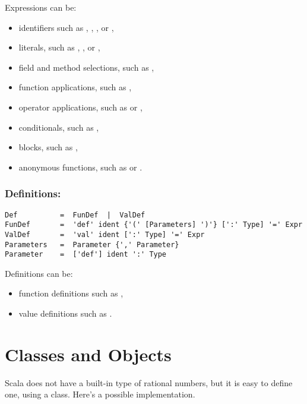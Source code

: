 \documentclass[a4paper,12pt,twoside,titlepage]{book}
\begin{document}
Expressions can be:
\begin{itemize}
\item
identifiers such as , , \code{*}, or \code{+-},
\item
literals, such as , , or ,
\item
field and method selections, such as ,
\item
function applications, such as , 
\item
operator applications, such as  or ,
\item
conditionals, such as ,
\item
blocks, such as ,
\item
anonymous functions, such as  or .
\end{itemize}

\subsection*{Definitions:}

\begin{lstlisting}
Def          =  FunDef  |  ValDef
FunDef       =  'def' ident {'(' [Parameters] ')'} [':' Type] '=' Expr
ValDef       =  'val' ident [':' Type] '=' Expr
Parameters   =  Parameter {',' Parameter}
Parameter    =  ['def'] ident ':' Type
\end{lstlisting}
Definitions can be:
\begin{itemize}
\item
function definitions such as , 
\item
value definitions such as .
\end{itemize}

\chapter{Classes and Objects}
\label{chap:classes}

Scala does not have a built-in type of rational numbers, but it is
easy to define one, using a class. Here's a possible implementation.
\end{document}
